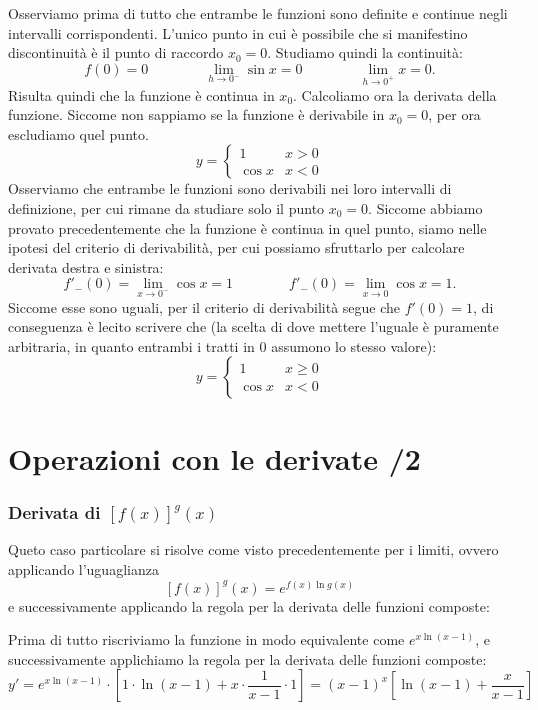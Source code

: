     Osserviamo prima di tutto che entrambe le funzioni sono definite e continue negli intervalli corrispondenti. L'unico punto in cui è possibile che si manifestino discontinuità è il punto di raccordo $x_0=0$. Studiamo quindi la continuità:
    \[f(0)=0\qquad \qquad \lim_{h\to 0^-}\sin x=0 \qquad\qquad \lim_{h\to 0^+} x=0.\]
    Risulta quindi che la funzione è continua in $x_0$. Calcoliamo ora la derivata della funzione. Siccome non sappiamo se la funzione è derivabile in $x_0=0$, per ora escludiamo quel punto.
    \[y=\begin{cases}
        1 & x>0\\
        \cos x & x<0
    \end{cases}\]
    Osserviamo che entrambe le funzioni sono derivabili nei loro intervalli di definizione, per cui rimane da studiare solo il punto $x_0=0$. Siccome abbiamo provato precedentemente che la funzione è continua in quel punto, siamo nelle ipotesi del criterio di derivabilità, per cui possiamo sfruttarlo per calcolare derivata destra e sinistra:
    \[f'_-(0)=\lim_{x\to0^-}\cos x=1\qquad\qquad f'_-(0)=\lim_{x\to 0}\cos x=1.\]
    Siccome esse sono uguali, per il criterio di derivabilità segue che $f'(0)=1$, di conseguenza è lecito scrivere che (la scelta di dove mettere l'uguale è puramente arbitraria, in quanto entrambi i tratti in 0 assumono lo stesso valore):
    \[y=\begin{cases}
        1 & x\geq0\\
        \cos x & x<0
    \end{cases}\]
    
\end{ex}

\section{Operazioni con le derivate /2}
\subsubsection{Derivata di $[f(x)]^g(x)$}
Queto caso particolare si risolve come visto precedentemente per i limiti, ovvero applicando l'uguaglianza 
\[\left[ f(x) \right]^g(x)=e^{f(x)\ln g(x)}\]
e successivamente applicando la regola per la derivata delle funzioni composte:
\begin{ex}
    Prima di tutto riscriviamo la funzione in modo equivalente come $e^{x\ln(x-1)}$, e successivamente applichiamo la regola per la derivata delle funzioni composte:
    \[y'=e^{x\ln (x-1)}\cdot \left[ 1\cdot \ln (x-1)+x\cdot \frac{1}{x-1}\cdot 1 \right]=(x-1)^x\left[ \ln (x-1) +\frac{x}{x-1}\right]\]
\end{ex}
